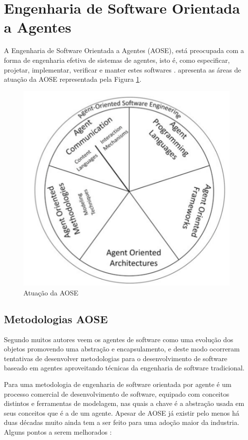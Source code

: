\documentclass[dm,ppgcomp]{texfurg} %
\begin{document}
\section{Engenharia de Software Orientada a Agentes}

A Engenharia de Software Orientada a Agentes (AOSE), está preocupada com a forma de engenharia efetiva de sistemas de agentes, isto é, como especificar, projetar, implementar, verificar e manter estes softwares \citep{winikoff2009future}. \citep{sturm2014agent} apresenta as áreas de atuação da AOSE representada pela Figura \ref{fig:aose_areas}.

\begin{figure}[ht]
\centering
\includegraphics[scale=0.5]{imagens/aose_areas.png}
\caption{Atuação da AOSE}
\label{fig:aose_areas}
\end{figure}

\subsection{Metodologias AOSE}

Segundo \citep{padgham2016agent} muitos autores veem os agentes de software como uma evolução dos objetos promovendo uma abstração e encapsulamento, e deste modo ocorreram tentativas de desenvolver metodologias para o desenvolvimento de software baseado em agentes aproveitando técnicas da engenharia de software tradicional. 

Para \citet{akbari2010survey} uma metodologia de engenharia de software orientada por agente é um processo comercial de desenvolvimento de software, equipado com conceitos distintos e ferramentas de modelagem, nas quais a chave é a abstração usada em seus conceitos que é a de um agente. Apesar de AOSE já existir pelo menos há duas décadas muito ainda tem a ser feito para uma adoção maior da industria. Alguns pontos a serem melhorados \cite{sturm2014agent}:
\end{document}
